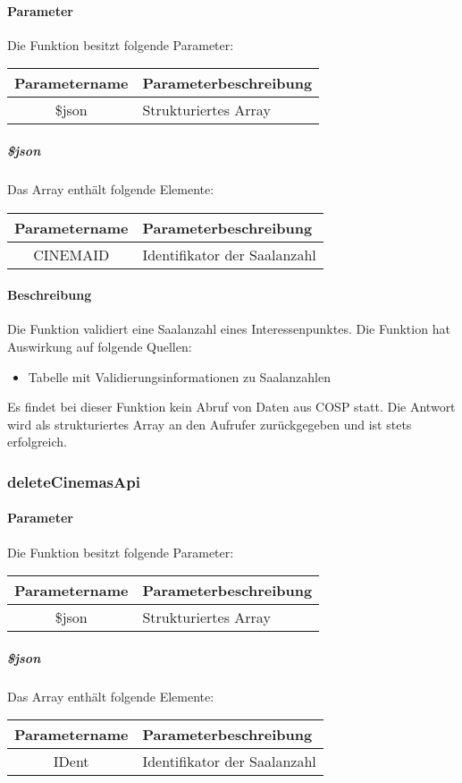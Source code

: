 \paragraph{Parameter} Die Funktion besitzt folgende Parameter:
\begin{table}[H]
	\begin{tabular}{|c|p{11cm}|}
		\hline
		\textbf{Parametername} & \textbf{Parameterbeschreibung} \\ \hline
		\$json & Strukturiertes Array \\ \hline
	\end{tabular}
\end{table}
\subparagraph{\$json}Das Array enthält folgende Elemente:
\begin{table}[H]
	\begin{tabular}{|c|p{11cm}|}
		\hline
		\textbf{Parametername} & \textbf{Parameterbeschreibung} \\ \hline
		CINEMAID   & Identifikator der Saalanzahl \\ \hline
	\end{tabular}
\end{table}
\paragraph{Beschreibung} Die Funktion validiert eine Saalanzahl eines Interessenpunktes. Die Funktion hat Auswirkung auf folgende Quellen:
\begin{itemize}
	\item Tabelle mit Validierungsinformationen zu Saalanzahlen
\end{itemize}
Es findet bei dieser Funktion kein Abruf von Daten aus {\glqq COSP\grqq} statt. Die Antwort wird als strukturiertes Array an den Aufrufer zurückgegeben und ist stets erfolgreich.
\subsubsection{deleteCinemasApi}
\paragraph{Parameter} Die Funktion besitzt folgende Parameter:
\begin{table}[H]
	\begin{tabular}{|c|p{11cm}|}
		\hline
		\textbf{Parametername} & \textbf{Parameterbeschreibung} \\ \hline
		\$json & Strukturiertes Array \\ \hline
	\end{tabular}
\end{table}
\subparagraph{\$json}Das Array enthält folgende Elemente:
\begin{table}[H]
	\begin{tabular}{|c|p{11cm}|}
		\hline
		\textbf{Parametername} & \textbf{Parameterbeschreibung} \\ \hline
		IDent    & Identifikator der Saalanzahl \\ \hline
	\end{tabular}
\end{table}
